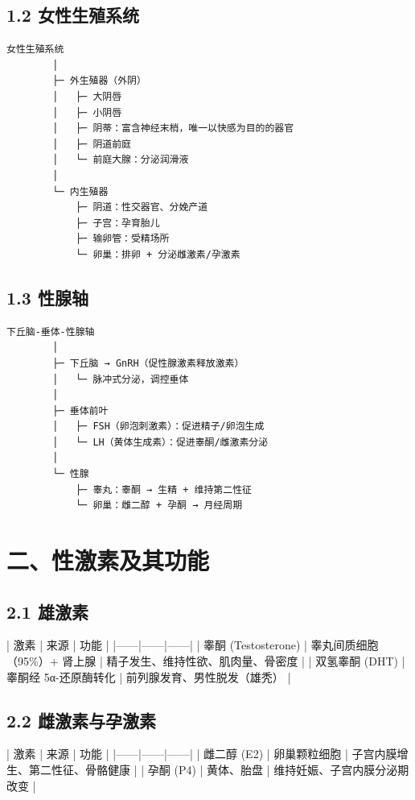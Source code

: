 \documentclass[12pt,UTF8,openany]{ctexbook}
\begin{document}
\subsection{1.2 女性生殖系统}

\begin{verbatim}
女性生殖系统
        │
        ├─ 外生殖器（外阴）
        │   ├─ 大阴唇
        │   ├─ 小阴唇
        │   ├─ 阴蒂：富含神经末梢，唯一以快感为目的的器官
        │   ├─ 阴道前庭
        │   └─ 前庭大腺：分泌润滑液
        │
        └─ 内生殖器
            ├─ 阴道：性交器官、分娩产道
            ├─ 子宫：孕育胎儿
            ├─ 输卵管：受精场所
            └─ 卵巢：排卵 + 分泌雌激素/孕激素
\end{verbatim}

\subsection{1.3 性腺轴}

\begin{verbatim}
下丘脑-垂体-性腺轴
        │
        ├─ 下丘脑 → GnRH（促性腺激素释放激素）
        │   └─ 脉冲式分泌，调控垂体
        │
        ├─ 垂体前叶
        │   ├─ FSH（卵泡刺激素）：促进精子/卵泡生成
        │   └─ LH（黄体生成素）：促进睾酮/雌激素分泌
        │
        └─ 性腺
            ├─ 睾丸：睾酮 → 生精 + 维持第二性征
            └─ 卵巢：雌二醇 + 孕酮 → 月经周期
\end{verbatim}

\hrulefill

\section{二、性激素及其功能}

\subsection{2.1 雄激素}

| 激素 | 来源 | 功能 |
|------|------|------|
| 睾酮 (Testosterone) | 睾丸间质细胞（95\%）+ 肾上腺 | 精子发生、维持性欲、肌肉量、骨密度 |
| 双氢睾酮 (DHT) | 睾酮经 5α-还原酶转化 | 前列腺发育、男性脱发（雄秃） |

\subsection{2.2 雌激素与孕激素}

| 激素 | 来源 | 功能 |
|------|------|------|
| 雌二醇 (E2) | 卵巢颗粒细胞 | 子宫内膜增生、第二性征、骨骼健康 |
| 孕酮 (P4) | 黄体、胎盘 | 维持妊娠、子宫内膜分泌期改变 |
\end{document}
